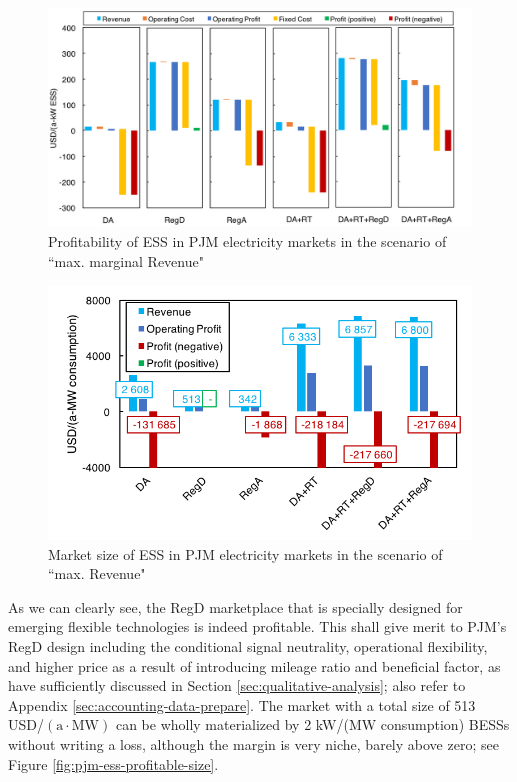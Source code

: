 \begin{figure}[h!]
	\centering
	\includegraphics[width=0.9\linewidth]{Figures/PJM_ESS_profitability}
	\caption{Profitability of ESS in PJM electricity markets in the scenario of ``max. marginal Revenue"}
	\label{fig:pjm-ess-profitability}
\end{figure}

\begin{figure}[h!]
	\centering
	\includegraphics[width=0.9\linewidth]{Figures/PJM_ESS}
	\caption{Market size of ESS in PJM electricity markets in the scenario of ``max. Revenue"}
	\label{fig:pjm-ess}
\end{figure}

As we can clearly see, the RegD marketplace that is specially designed for emerging flexible technologies is indeed profitable. This shall give merit to PJM's RegD design including the conditional signal neutrality, operational flexibility, and higher price as a result of introducing mileage ratio and beneficial factor, as have sufficiently discussed in Section \ref{sec:qualitative-analysis}; also refer to Appendix \ref{sec:accounting-data-prepare}. The market with a total size of 513 USD/$(\text{a} \cdot \text{MW})$ can be wholly materialized by 2 kW/(MW consumption) BESSs without writing a loss, although the margin is very niche, barely above zero; see Figure \ref{fig:pjm-ess-profitable-size}.

